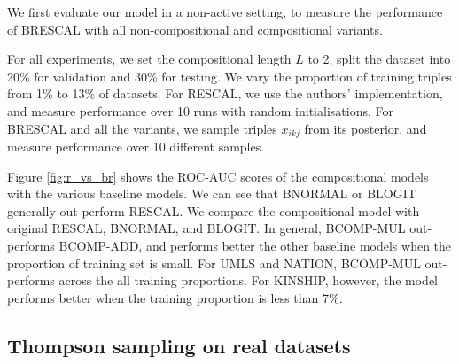 We first evaluate our model in a non-active setting, 
to measure the performance of BRESCAL with all non-compositional and compositional variants.

For all experiments, we set the compositional length $L$ to 2, split the dataset into 20\% for validation and 30\% for testing. We vary the proportion of training triples
from 1\% to 13\% of datasets. For RESCAL, we use the authors' implementation, and measure performance over 10 runs with random initialisations. For BRESCAL and all the variants, we sample triples $x_{ikj}$ from its posterior, and measure performance over 10 different samples.

Figure \ref{fig:r_vs_br} shows the ROC-AUC scores of the compositional models with the various baseline models. We can see that BNORMAL or BLOGIT generally out-perform RESCAL. We compare the compositional model with original RESCAL, BNORMAL, and BLOGIT. In general, BCOMP-MUL out-performs BCOMP-ADD, and performs better the other baseline models when the proportion of training set is small. For UMLS and NATION, BCOMP-MUL out-performs across the all training proportions. For KINSHIP, however, the model performs better when the training proportion is less than 7\%.


\subsection{Thompson sampling on real datasets}

